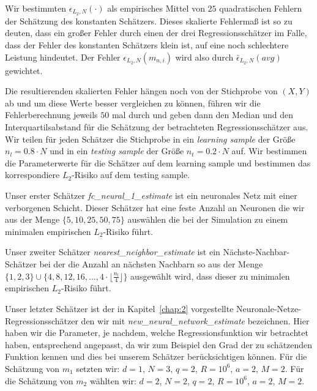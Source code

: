 Wir bestimmten $\epsilon_{L_2,N}(\cdot)$ als empirisches Mittel von $25$ quadratischen Fehlern der Schätzung des konstanten Schätzers. Dieses skalierte Fehlermaß ist so zu deuten, dass ein großer Fehler durch einen der drei Regressionsschätzer im Falle, dass der Fehler des konstanten Schätzers klein ist, auf eine noch schlechtere Leistung hindeutet. Der Fehler $\epsilon_{L_2,N}(m_{n,i})$ wird also durch $\bar{\epsilon}_{L_2,N}(avg)$ gewichtet.

Die resultierenden skalierten Fehler hängen noch von der Stichprobe von $(X, Y)$ ab und um diese Werte besser vergleichen zu können, führen wir die Fehlerberechnung jeweils $50$ mal durch und geben dann den Median und den Interquartilsabstand für die Schätzung der betrachteten Regressionsschätzer aus.
Wir teilen für jeden Schätzer die Stichprobe in ein \textit{learning sample} der Größe $n_l = 0.8 \cdot N$ und in ein \textit{testing sample} der Größe $n_t = 0.2 \cdot N$ auf. Wir bestimmen die Parameterwerte für die Schätzer auf dem learning sample und bestimmen das korrespondiere $L_2$-Risiko auf dem testing sample.

Unser erster Schätzer \textit{fc\_neural\_1\_estimate} ist ein neuronales Netz mit einer verborgenen Schicht. Dieser Schätzer hat eine feste Anzahl an Neuronen die wir aus der Menge $\{5, 10, 25, 50, 75\}$ auswählen die bei der Simulation zu einem minimalen empirischen $L_2$-Risiko führt.

Unser zweiter Schätzer \textit{nearest\_neighbor\_estimate} ist ein Nächste-Nachbar-Schätzer bei der die Anzahl an nächsten Nachbarn so aus der Menge $\{1, 2, 3\} \cup \{4, 8, 12, 16, \dots, 4 \cdot \lfloor\frac{n_l}{4}\rfloor\}$ ausgewählt wird, dass dieser zu minimalen empirischen $L_2$-Risiko führt.

Unser letzter Schätzer ist der in Kapitel~\ref{chap:2} vorgestellte Neuronale-Netze-Regressionsschätzer den wir mit \textit{new\_neural\_network\_estimate} bezeichnen. Hier haben wir die Parameter, je nachdem, welche Regressionsfunktion wir betrachtet haben, entsprechend angepasst, da wir zum Beispiel den Grad der zu schätzenden Funktion kennen und dies bei unserem Schätzer berücksichtigen können. Für die Schätzung von $m_1$ setzten wir: $d = 1$, $N = 3$, $q = 2$, $R = 10^6$, $a = 2$, $M = 2$.
Für die Schätzung von $m_2$ wählten wir: $d = 2$, $N = 2$, $q = 2$, $R = 10^6$, $a = 2$, $M = 2$.

